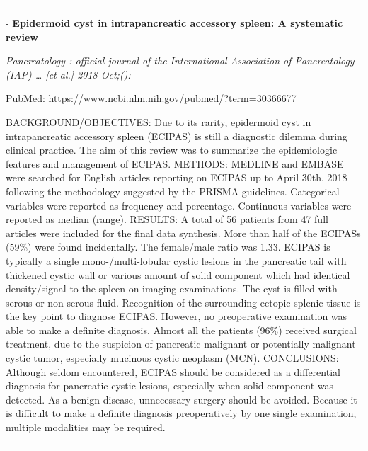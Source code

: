 \documentclass[]{article}
\begin{document}
{}

{}

\begin{center}\rule{0.5\linewidth}{\linethickness}\end{center}

 - \textbf{Epidermoid cyst in intrapancreatic accessory spleen: A
systematic review}

\emph{Pancreatology : official journal of the International Association
of Pancreatology (IAP) \ldots{} {[}et al.{]} 2018 Oct;():}

PubMed: \url{https://www.ncbi.nlm.nih.gov/pubmed/?term=30366677}

BACKGROUND/OBJECTIVES: Due to its rarity, epidermoid cyst in
intrapancreatic accessory spleen (ECIPAS) is still a diagnostic dilemma
during clinical practice. The aim of this review was to summarize the
epidemiologic features and management of ECIPAS. METHODS: MEDLINE and
EMBASE were searched for English articles reporting on ECIPAS up to
April 30th, 2018 following the methodology suggested by the PRISMA
guidelines. Categorical variables were reported as frequency and
percentage. Continuous variables were reported as median (range).
RESULTS: A total of 56 patients from 47 full articles were included for
the final data synthesis. More than half of the ECIPASs (59\%) were
found incidentally. The female/male ratio was 1.33. ECIPAS is typically
a single mono-/multi-lobular cystic lesions in the pancreatic tail with
thickened cystic wall or various amount of solid component which had
identical density/signal to the spleen on imaging examinations. The cyst
is filled with serous or non-serous fluid. Recognition of the
surrounding ectopic splenic tissue is the key point to diagnose ECIPAS.
However, no preoperative examination was able to make a definite
diagnosis. Almost all the patients (96\%) received surgical treatment,
due to the suspicion of pancreatic malignant or potentially malignant
cystic tumor, especially mucinous cystic neoplasm (MCN). CONCLUSIONS:
Although seldom encountered, ECIPAS should be considered as a
differential diagnosis for pancreatic cystic lesions, especially when
solid component was detected. As a benign disease, unnecessary surgery
should be avoided. Because it is difficult to make a definite diagnosis
preoperatively by one single examination, multiple modalities may be
required.

{}

{}

\begin{center}\rule{0.5\linewidth}{\linethickness}\end{center}
\end{document}
